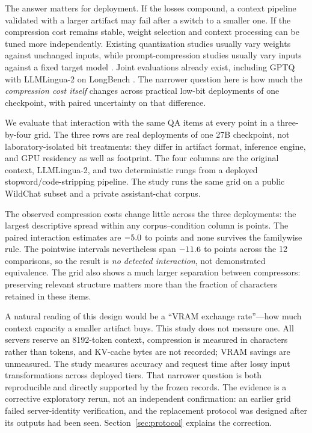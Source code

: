 \documentclass[11pt]{article}
\begin{document}
The answer matters for deployment. If the losses compound, a context pipeline
validated with a larger artifact may fail after a switch to a smaller one. If
the compression cost remains stable, weight selection and context processing
can be tuned more independently. Existing quantization studies usually vary
weights against unchanged inputs, while prompt-compression studies usually
vary inputs against a fixed target model
\citep{jiang2023llmlingua,pan2024llmlingua2,li2023selective,zhang2025empirical}.
Joint evaluations already exist, including GPTQ with LLMLingua-2 on LongBench
\citep{ahmed2025systematic}. The narrower question here is how much the
\emph{compression cost itself} changes across practical low-bit deployments
of one checkpoint, with paired uncertainty on that difference.

We evaluate that interaction with the same QA items at every point in a
three-by-four grid. The three rows are real deployments of one 27B checkpoint,
not laboratory-isolated bit treatments: they differ in artifact format,
inference engine, and GPU residency as well as footprint. The four columns are
the original context, LLMLingua-2, and two deterministic rungs from a deployed
stopword/code-stripping pipeline. The study runs the same grid on a public
WildChat subset and a private assistant-chat corpus.

The observed compression costs change little across the three deployments:
the largest descriptive spread within any corpus--condition column is
\PtwoTierSpreadMax{} points. The paired interaction estimates are
$-5.0$ to \PtwoInterDeltaMax{} points and none survives the
familywise rule. The pointwise intervals nevertheless span
$-11.6$ to \PtwoInterCiHighMax{} points across the 12 comparisons,
so the result is \emph{no detected interaction}, not demonstrated equivalence.
The grid
also shows a much larger separation between compressors: preserving relevant
structure matters more than the fraction of characters retained in these
items.

A natural reading of this design would be a ``VRAM exchange rate''---how much
context capacity a smaller artifact buys. This study does not measure one.
All servers reserve an
8192-token context, compression is measured in characters rather than tokens,
and KV-cache bytes are not recorded; VRAM savings are unmeasured. The study
measures accuracy and request time after lossy input transformations across
deployed tiers. That narrower question is both reproducible and directly
supported by the frozen records. The evidence is a corrective exploratory
rerun, not an independent confirmation: an earlier grid failed server-identity
verification, and the replacement protocol was designed after its outputs had
been seen. Section~\ref{sec:protocol} explains the correction.
\end{document}
